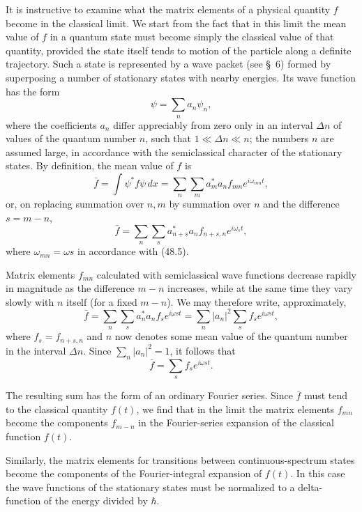 It is instructive to examine what the matrix elements of a physical quantity
$f$ become in the classical limit. We start from the fact that in this limit
the mean value of $f$ in a quantum state must become simply the classical
value of that quantity, provided the state itself tends to motion of the
particle along a definite trajectory. Such a state is represented by a wave
packet (see §~6) formed by superposing a number of stationary states with
nearby energies. Its wave function has the form
\[
  \psi=\sum_n a_n\psi_n,
\]
where the coefficients $a_n$ differ appreciably from zero only in an interval
$\Delta n$ of values of the quantum number $n$, such that
$1\ll\Delta n\ll n$; the numbers $n$ are assumed large, in accordance with
the semiclassical character of the stationary states. By definition, the mean
value of $f$ is
\[
  \bar f=\int\psi^*f\psi\,dx
  =\sum_n\sum_m a_m^*a_nf_{mn}e^{i\omega_{mn}t},
\]
or, on replacing summation over $n,m$ by summation over $n$ and the difference
$s=m-n$,
\[
  \bar f=\sum_n\sum_s a_{n+s}^*a_nf_{n+s,n}e^{i\omega_st},
\]
where $\omega_{mn}=\omega s$ in accordance with (48.5).

Matrix elements $f_{mn}$ calculated with semiclassical wave functions decrease
rapidly in magnitude as the difference $m-n$ increases, while at the same time
they vary slowly with $n$ itself (for a fixed $m-n$). We may therefore write,
approximately,
\[
  \bar f=\sum_n\sum_s a_n^*a_nf_se^{i\omega st}
  =\sum_n|a_n|^2\sum_sf_se^{i\omega st},
\]
where $f_s=f_{n+s,n}$ and $n$ now denotes some mean value of the quantum
number in the interval $\Delta n$. Since $\sum_n|a_n|^2=1$, it follows that
\[
  \bar f=\sum_sf_se^{i\omega st}.
\]

The resulting sum has the form of an ordinary Fourier series. Since $\bar f$
must tend to the classical quantity $f(t)$, we find that in the limit the
matrix elements $f_{mn}$ become the components $f_{m-n}$ in the Fourier-series
expansion of the classical function $f(t)$.

Similarly, the matrix elements for transitions between continuous-spectrum
states become the components of the Fourier-integral expansion of $f(t)$. In
this case the wave functions of the stationary states must be normalized to a
delta-function of the energy divided by $\hbar$.

